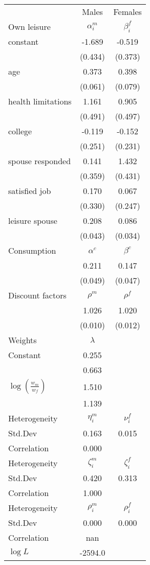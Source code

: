 \begin{tabular}{lcc} 
\hline\hline 
 & Males & Females \\ 
Own leisure & $\alpha_{i}^{m}$ & $\beta_{i}^{f}$ \\ 
constant & -1.689 & -0.519 \\ 
 & (0.434) & (0.373) \\ 
age & 0.373 & 0.398 \\ 
 & (0.061) & (0.079) \\ 
health limitations & 1.161 & 0.905 \\ 
 & (0.491) & (0.497) \\ 
college & -0.119 & -0.152 \\ 
 & (0.251) & (0.231) \\ 
spouse responded & 0.141 & 1.432 \\ 
 & (0.359) & (0.431) \\ 
satisfied job & 0.170 & 0.067 \\ 
 & (0.330) & (0.247) \\ 
leisure spouse & 0.208 & 0.086 \\ 
 & (0.043) & (0.034) \\ 
Consumption & $\alpha^{c}$ & $\beta^{c}$ \\ 
 & 0.211 & 0.147 \\ 
 & (0.049) & (0.047) \\ 
Discount factors & $\rho^m$ & $\rho^f$ \\ 
 & 1.026 & 1.020 \\ 
 & (0.010) & (0.012) \\ 
Weights & $\lambda$ &  \\ 
Constant & 0.255 &  \\ 
 & 0.663 &  \\ 
$\log(\frac{w_m}{w_f})$ & 1.510 &  \\ 
 & 1.139 &  \\ 
Heterogeneity & $\eta_i^m$ & $\nu_i^f$ \\ 
Std.Dev & 0.163 & 0.015 \\ 
Correlation & 0.000 &  \\ 
Heterogeneity & $\zeta_i^m$ & $\zeta_i^f$ \\ 
Std.Dev & 0.420 & 0.313 \\ 
Correlation & 1.000 &  \\ 
Heterogeneity & $\rho_i^m$ & $\rho_i^f$ \\ 
Std.Dev & 0.000 & 0.000 \\ 
Correlation & nan &  \\ 
\hline 
$\log L$ & -2594.0 & \\ 
\hline \hline 
\end{tabular} 
